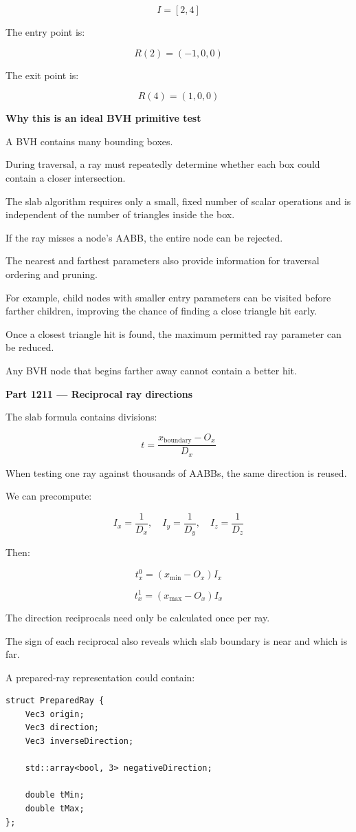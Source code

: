 \[
\boxed{I=[2,4]}
\]

The entry point is:

\[
R(2)=(-1,0,0)
\]

The exit point is:

\[
R(4)=(1,0,0)
\]

\textbf{Why this is an ideal BVH primitive test}

A BVH contains many bounding boxes.

During traversal, a ray must repeatedly determine whether each box could contain a closer intersection.

The slab algorithm requires only a small, fixed number of scalar operations and is independent of the number of triangles inside the box.

If the ray misses a node's AABB, the entire node can be rejected.

The nearest and farthest parameters also provide information for traversal ordering and pruning.

For example, child nodes with smaller entry parameters can be visited before farther children, improving the chance of finding a close triangle hit early.

Once a closest triangle hit is found, the maximum permitted ray parameter can be reduced.

Any BVH node that begins farther away cannot contain a better hit.

\textbf{Part 1211 --- Reciprocal ray directions}

The slab formula contains divisions:

\[
t=\frac{x_{\mathrm{boundary}}-O_x}{D_x}
\]

When testing one ray against thousands of AABBs, the same direction is reused.

We can precompute:

\[
\boxed{ I_x=\frac1{D_x},\quad I_y=\frac1{D_y},\quad I_z=\frac1{D_z} }
\]

Then:

\[
t_x^0=(x_{\min}-O_x)I_x
\]

\[
t_x^1=(x_{\max}-O_x)I_x
\]

The direction reciprocals need only be calculated once per ray.

The sign of each reciprocal also reveals which slab boundary is near and which is far.

A prepared-ray representation could contain:

\begin{verbatim}
struct PreparedRay {
    Vec3 origin;
    Vec3 direction;
    Vec3 inverseDirection;

    std::array<bool, 3> negativeDirection;

    double tMin;
    double tMax;
};
\end{verbatim}

